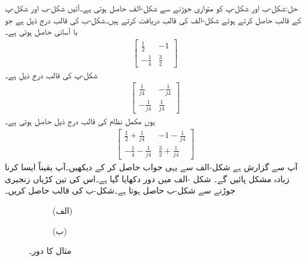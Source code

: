 حل:شکل-ب اور شکل-پ کو متوازی جوڑنے سے شکل-الف حاصل ہوتی ہے۔آئیں شکل-ب اور شکل-پ کے قالب حاصل کرتے ہوئے شکل-الف کی قالب دریافت کرتے ہیں۔شکل-ب کی قالب درج ذیل ہے جو با آسانی حاصل ہوتی ہے۔
\begin{align*}
\begin{bmatrix}
\frac{1}{2} & -1\\
-\frac{1}{4}& \frac{3}{2}
\end{bmatrix}
\end{align*}
 شکل-پ کی قالب درج ذیل ہے۔
\begin{align*}
\begin{bmatrix}
\frac{1}{j4}& -\frac{1}{j4}\\
-\frac{1}{j4}& \frac{1}{j4}
\end{bmatrix}
\end{align*}
یوں مکمل نظام کی قالب درج ذیل حاصل ہوتی ہے۔
\begin{align*}
\begin{bmatrix}
\frac{1}{2} +\frac{1}{j4}& -1-\frac{1}{j4}\\
-\frac{1}{4}-\frac{1}{j4}& \frac{3}{2}+\frac{1}{j4}
\end{bmatrix}
\end{align*}
آپ سے گزارش ہے شکل-الف سے یہی جواب حاصل کر کے دیکھیں۔آپ یقیناً ایسا کرنا زیادہ مشکل پائیں گے۔
شکل -الف میں  دور دکھایا گیا ہے۔اس کی تین کڑیاں زنجیری جوڑنے سے شکل-ب حاصل ہوتا ہے۔شکل-ب کی  قالب حاصل کریں۔
\begin{figure}
\centering
\begin{subfigure}{1\textwidth}
\centering
{}
\caption*{(الف)}
\end{subfigure}
\begin{subfigure}{1\textwidth}
\centering
{}
\caption*{(ب)}
\end{subfigure}
\caption{مثال  کا دور۔}
\label{شکل_نمونہ_چھلنی_زنجیری}
\end{figure}

